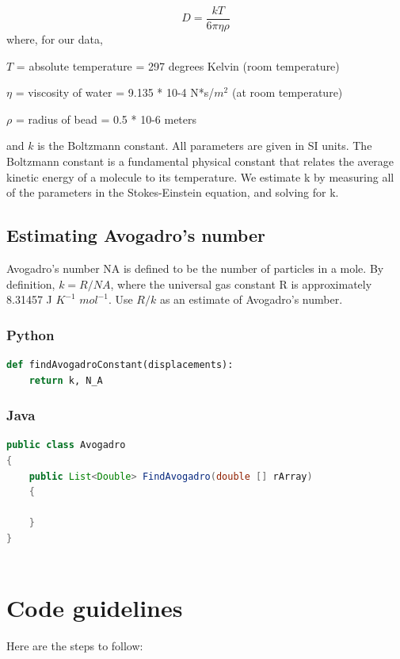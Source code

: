 \documentclass[]{article}
\begin{document}
\begin{equation}
    D=\frac{kT}{6\pi\eta\rho}
\end{equation}
 where, for our data,
 
$T$ = absolute temperature = 297 degrees Kelvin (room temperature)

$\eta$ = viscosity of water = 9.135 * 10-4 N*s/$m^2$ (at room temperature)

$\rho$ = radius of bead = 0.5 * 10-6 meters 

and $k$ is the Boltzmann constant. All parameters are given in SI units. The Boltzmann constant is a fundamental physical constant that relates the average kinetic energy of a molecule to its temperature. We estimate k by measuring all of the parameters in the Stokes-Einstein equation, and solving for k.

 \subsection{Estimating Avogadro's number}
 Avogadro's number NA is defined to be the number of particles in a mole. By definition, $k = R / NA$, where the universal gas constant R is approximately 8.31457 J $K^{-1}$ $mol^{-1}$. Use $R / k$ as an estimate of Avogadro's number.
 
 \subsubsection{Python}
\begin{lstlisting}[language=Python]
def findAvogadroConstant(displacements):
    return k, N_A
\end{lstlisting}

 \subsubsection{Java}
\begin{lstlisting}[language=Java]
public class Avogadro 
{
    public List<Double> FindAvogadro(double [] rArray) 
    {
        
    }
}
    
\end{lstlisting}

\section{Code guidelines}

Here are the steps to follow:
\end{document}
